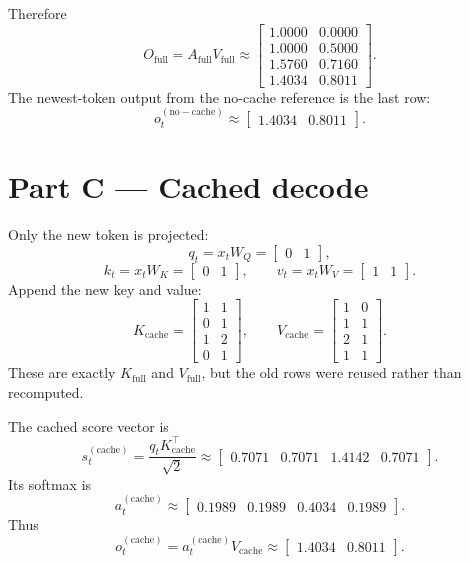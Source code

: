 \documentclass[11pt]{article}
\begin{document}
Therefore
\[
O_{\mathrm{full}}=A_{\mathrm{full}}V_{\mathrm{full}}
\approx
\begin{bmatrix}
1.0000&0.0000\\
1.0000&0.5000\\
1.5760&0.7160\\
1.4034&0.8011
\end{bmatrix}.
\]
The newest-token output from the no-cache reference is the last row:
\[
\boxed{o_t^{(\mathrm{no-cache})}\approx\begin{bmatrix}1.4034&0.8011\end{bmatrix}}.
\]

\section*{Part C --- Cached decode}

Only the new token is projected:
\[
q_t=x_tW_Q=\begin{bmatrix}0&1\end{bmatrix},
\]
\[
k_t=x_tW_K=\begin{bmatrix}0&1\end{bmatrix},
\qquad
v_t=x_tW_V=\begin{bmatrix}1&1\end{bmatrix}.
\]
Append the new key and value:
\[
K_{\mathrm{cache}}=
\begin{bmatrix}
1&1\\0&1\\1&2\\0&1
\end{bmatrix},
\qquad
V_{\mathrm{cache}}=
\begin{bmatrix}
1&0\\1&1\\2&1\\1&1
\end{bmatrix}.
\]
These are exactly $K_{\mathrm{full}}$ and $V_{\mathrm{full}}$, but the old rows were reused rather than recomputed.

The cached score vector is
\[
s_t^{(\mathrm{cache})}
=\frac{q_tK_{\mathrm{cache}}^\top}{\sqrt{2}}
\approx
\begin{bmatrix}
0.7071&0.7071&1.4142&0.7071
\end{bmatrix}.
\]
Its softmax is
\[
a_t^{(\mathrm{cache})}
\approx
\begin{bmatrix}
0.1989&0.1989&0.4034&0.1989
\end{bmatrix}.
\]
Thus
\[
o_t^{(\mathrm{cache})}
=a_t^{(\mathrm{cache})}V_{\mathrm{cache}}
\approx
\boxed{\begin{bmatrix}1.4034&0.8011\end{bmatrix}}.
\]
\end{document}
